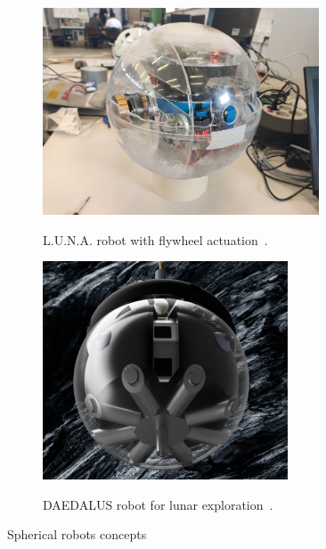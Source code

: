 \documentclass[english, bachelor, utf8]{base/thesis_telematics}
\begin{document}
\begin{figure}[h]
    \centering
\begin{subfigure}{0.48\textwidth}
    \centering
    \includegraphics[width=0.9\textwidth]{pics/luna.png}
    \label{fig:luna_flywheel}
    \caption{L.U.N.A. robot with flywheel actuation~\cite{luna}.}
\end{subfigure}
\hfill
\begin{subfigure}{0.48\textwidth}
    \centering
    \includegraphics[width=0.8\textwidth]{pics/DAEDALUS.png}
    \label{fig:daedalus}
    \caption{DAEDALUS robot for lunar exploration~\cite{esa_lunar_cave_explorer}.}
\end{subfigure}
\label{fig:spherical_robots}
\caption{Spherical robots concepts}
\end{figure}
\end{document}
